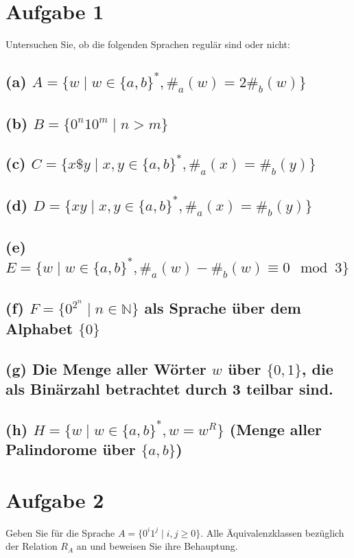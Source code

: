 \documentclass[titlepage]{article}
\renewcommand{\]}{\right]}
\renewcommand{\[}{\left[}
\renewcommand{\)}{\right)}
\renewcommand{\(}{\left(}
\renewcommand{\|}{\;|\;}
\begin{document}
\begingroup\let\clearpage\relax
	
	
	\section*{Aufgabe 1}
		Untersuchen Sie, ob die folgenden Sprachen regulär sind oder nicht:
		\subsection*{(a) $A=\{w\mid w\in\{a,b\}^*,\#_a(w)=2\#_b(w)\}$}
			
		\subsection*{(b) $B=\{0^n10^m\mid n>m\}$}
			
		\subsection*{(c) $C=\{x\$y\mid x,y\in\{a,b\}^*,\#_a(x)=\#_b(y)\}$}
			
		\subsection*{(d) $D=\{xy\mid x,y\in\{a,b\}^*,\#_a(x)=\#_b(y)\}$}
			
		\subsection*{(e) $E=\{w\mid w\in\{a,b\}^*,\#_a(w)-\#_b(w)\equiv0\mod3\}$}
			
		\subsection*{(f) $F=\{0^{2^n}\mid n\in\mathbb{N}\}$ als Sprache über dem Alphabet $\{0\}$}
			
		\subsection*{(g) Die Menge aller Wörter $w$ über $\{0,1\}$, die als Binärzahl betrachtet durch 3 teilbar sind.}
			
		\subsection*{(h) $H=\{w\mid w\in\{a,b\}^*,w=w^R\}$ (Menge aller Palindorome über $\{a,b\}$)}
			
		
	\section*{Aufgabe 2}
		Geben Sie für die Sprache $A=\{0^i1^j\mid i,j\ge0\}.$ Alle Äquivalenzklassen bezüglich der Relation $R_A$ an und beweisen Sie ihre Behauptung.
		
	
\endgroup
\end{document}
